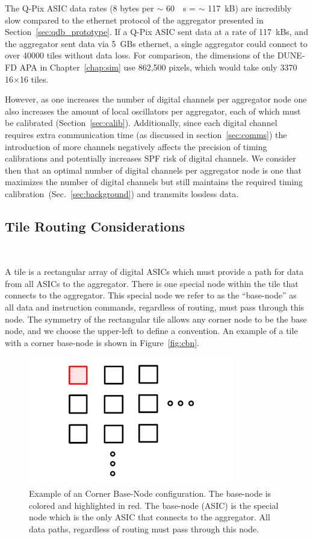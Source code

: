 The Q-Pix ASIC data rates (8 bytes per $\sim$ 60~\unit{\mu s} = $\sim$ 117~\unit{kB}) are incredibly slow compared to the ethernet protocol of the aggregator presented in Section~\ref{sec:qdb_prototype}.
If a Q-Pix ASIC sent data at a rate of 117~\unit{kBs}, and the aggregator sent data via 5~\unit{GBs} ethernet, a single aggregator could connect to over 40000 tiles without data loss.
For comparison, the dimensions of the DUNE-FD APA in Chapter~\ref{chap:sim} use 862,500 pixels, which would take only 3370 16$\times$16 tiles.

However, as one increases the number of digital channels per aggregator node one also increases the amount of local oscillators per aggregator, each of which must be calibrated (Section~\ref{sec:calib}).
Additionally, since each digital channel requires extra communication time (as discussed in section~\ref{sec:comms}) the introduction of more channels negatively affects the precision of timing calibrations and potentially increases SPF risk of digital channels.
We consider then that an optimal number of digital channels per aggregator node is one that maximizes the number of digital channels but still maintains the required timing calibration~(Sec.~\ref{sec:background}) and transmits lossless data.

\subsection{Tile Routing Considerations}~\label{sec:tile_sim}

A tile is a rectangular array of digital ASICs which must provide a path for data from all ASICs to the aggregator.
There is one special node within the tile that connects to the aggregator.
This special node we refer to as the ``base-node'' as all data and instruction commands, regardless of routing, must pass through this node.
The symmetry of the rectangular tile allows any corner node to be the base node, and we choose the upper-left to define a convention.
An example of a tile with a corner base-node is shown in Figure~\ref{fig:cbn}.

\begin{figure}[]
\centering
\includegraphics[width=0.8\textwidth]{images/CBN.pdf}
\caption{Example of an Corner Base-Node configuration.
The base-node is colored and highlighted in red.
The base-node (ASIC) is the special node which is the only ASIC that connects to the aggregator. 
All data paths, regardless of routing must pass through this node.
}
\end{figure}~\label{fig:cbn}


